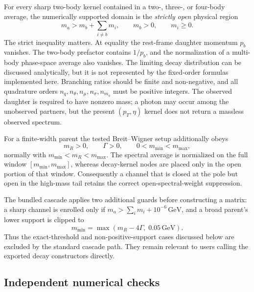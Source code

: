 \documentclass[11pt]{article}
\begin{document}
For every sharp two-body kernel contained in a two-, three-, or four-body
average, the numerically supported domain is the \emph{strictly open} physical
region
\begin{equation}
 m_a > m_b+\sum_{i\ne b}m_i,\qquad
 m_b>0,\qquad m_i\ge 0 .
 \label{eq:strict-domain}
\end{equation}
The strict inequality matters.  At equality the rest-frame daughter momentum
$p_b$ vanishes.  The two-body prefactor contains $1/p_b$, and the normalization
of a multi-body phase-space average also vanishes.  The limiting decay
distribution can be discussed analytically, but it is not represented by the
fixed-order formulas implemented here.  Branching ratios should be finite and
non-negative, and all quadrature orders
$n_q,n_\theta,n_\mu,n_\sigma,n_{m_a}$ must be positive integers.  The observed
daughter is required to have nonzero mass; a photon may occur among the
unobserved partners, but the present $(p_T,\eta)$ kernel does not return a
massless observed spectrum.

For a finite-width parent the tested Breit--Wigner setup additionally obeys
\begin{equation}
 m_R>0,\qquad \Gamma>0,\qquad
 0<m_{\min}<m_{\max},
 \label{eq:bw-domain}
\end{equation}
normally with $m_{\min}<m_R<m_{\max}$.  The spectral average is normalized on
the full window $[m_{\min},m_{\max}]$, whereas decay-kernel nodes are placed
only in the open portion of that window.  Consequently a channel that is
closed at the pole but open in the high-mass tail retains the correct
open-spectral-weight suppression.

The bundled cascade applies two additional guards before constructing a
matrix: a sharp channel is enrolled only if
$m_a>\sum_i m_i+10^{-6}\,\mathrm{GeV}$, and a broad parent's lower support is
clipped to
\begin{equation}
 m_{\min}=\max(m_R-4\Gamma,\;0.05\,\mathrm{GeV}).
\end{equation}
Thus the exact-threshold and non-positive-support cases discussed below are
excluded by the standard cascade path.  They remain relevant to users calling
the exported decay constructors directly.

\subsection{Independent numerical checks}
\end{document}
